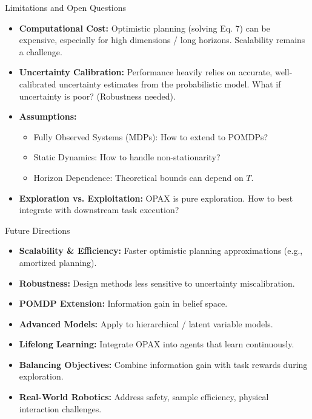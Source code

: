 \documentclass[11pt,aspectratio=169]{beamer}
\begin{document}
\begin{frame}{Limitations and Open Questions}
    \begin{itemize}
        \item \textbf{Computational Cost:} Optimistic planning (solving Eq. 7) can be expensive, especially for high dimensions / long horizons. Scalability remains a challenge.
        \pause
        \item \textbf{Uncertainty Calibration:} Performance heavily relies on accurate, well-calibrated uncertainty estimates from the probabilistic model. What if uncertainty is poor? (Robustness needed).
        \pause
        \item \textbf{Assumptions:}
        \begin{itemize}
            \item Fully Observed Systems (MDPs): How to extend to POMDPs?
            \item Static Dynamics: How to handle non-stationarity?
            \item Horizon Dependence: Theoretical bounds can depend on $T$.
        \end{itemize}
        \pause
        \item \textbf{Exploration vs. Exploitation:} OPAX is pure exploration. How to best integrate with downstream task execution?
    \end{itemize}
\end{frame}

\begin{frame}{Future Directions}
    \begin{itemize}
        \item \textbf{Scalability \& Efficiency:} Faster optimistic planning approximations (e.g., amortized planning).
        \item \textbf{Robustness:} Design methods less sensitive to uncertainty miscalibration.
        \item \textbf{POMDP Extension:} Information gain in belief space.
        \item \textbf{Advanced Models:} Apply to hierarchical / latent variable models.
        \item \textbf{Lifelong Learning:} Integrate OPAX into agents that learn continuously.
        \item \textbf{Balancing Objectives:} Combine information gain with task rewards during exploration.
        \item \textbf{Real-World Robotics:} Address safety, sample efficiency, physical interaction challenges.
    \end{itemize}
\end{frame}
\end{document}
